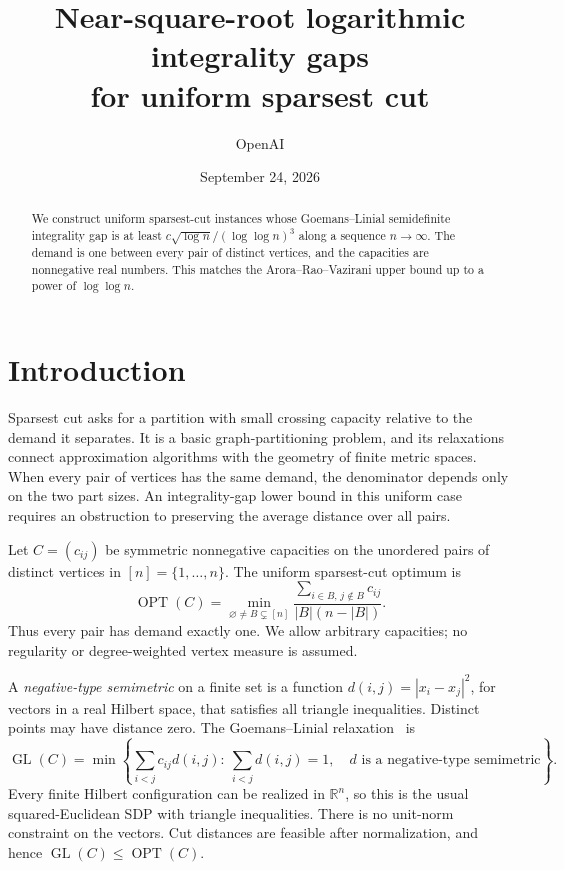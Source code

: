\documentclass[11pt]{article}
\title{Near-square-root logarithmic integrality gaps\\for uniform sparsest cut}
\author{OpenAI}
\date{September 24, 2026}
\numberwithin{equation}{section}
\theoremstyle{definition}
\theoremstyle{remark}
\newcommand{\R}{\mathbb R}
\DeclareMathOperator{\GL}{GL}
\DeclareMathOperator{\OPT}{OPT}
\begin{document}
\maketitle
\begin{abstract}
We construct uniform sparsest-cut instances whose Goemans--Linial
semidefinite integrality gap is at least
$c\sqrt{\log n}/(\log\log n)^3$ along a sequence $n\to\infty$.
The demand is one between every pair of distinct vertices, and the
capacities are nonnegative real numbers. This matches the
Arora--Rao--Vazirani upper bound up to a power of $\log\log n$.
\end{abstract}

\section{Introduction}
\label{sec:introduction}

Sparsest cut asks for a partition with small crossing capacity relative
to the demand it separates. It is a basic graph-partitioning problem,
and its relaxations connect approximation algorithms with the geometry
of finite metric spaces. When every pair of vertices has the same
demand, the denominator depends only on the two part sizes. An
integrality-gap lower bound in this uniform case requires an obstruction
to preserving the average distance over all pairs.

Let $C=(c_{ij})$ be symmetric nonnegative capacities on the unordered
pairs of distinct vertices in $[n]=\{1,\ldots,n\}$. The uniform
sparsest-cut optimum is
\begin{equation}\label{eq:opt}
\OPT(C)=\min_{\varnothing\ne B\subsetneq[n]}
\frac{\sum_{i\in B,\,j\notin B}c_{ij}}{|B|(n-|B|)}.
\end{equation}
Thus every pair has demand exactly one. We allow arbitrary capacities;
no regularity or degree-weighted vertex measure is assumed.

A \emph{negative-type semimetric} on a finite set is a function
$d(i,j)=|x_i-x_j|^2$, for vectors in a real Hilbert space, that satisfies
all triangle inequalities. Distinct points may have distance zero.
The Goemans--Linial relaxation~\cite{Goe97,Lin02} is
\begin{equation}\label{eq:gl}
\GL(C)=\min\left\{
\sum_{i<j}c_{ij}d(i,j):\
\sum_{i<j}d(i,j)=1,\quad d\text{ is a negative-type semimetric}
\right\}.
\end{equation}
Every finite Hilbert configuration can be realized in $\R^n$, so this
is the usual squared-Euclidean SDP with triangle inequalities.
There is no unit-norm constraint on the vectors. Cut distances are
feasible after normalization, and hence $\GL(C)\le\OPT(C)$.
\end{document}

